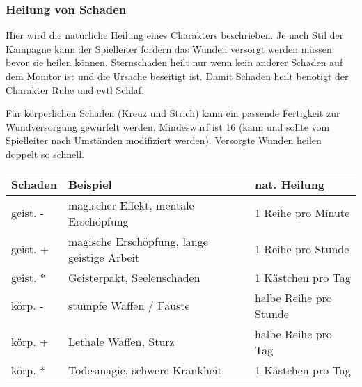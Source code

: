 \documentclass{article}
\begin{document}
\subsubsection{Heilung von Schaden}

Hier wird die natürliche Heilung eines Charakters beschrieben. Je nach Stil der Kampagne kann der Spielleiter
fordern das Wunden versorgt werden müssen bevor sie heilen können. Sternschaden heilt nur wenn kein anderer Schaden
auf dem Monitor ist und die Ursache beseitigt ist. Damit Schaden heilt benötigt der Charakter Ruhe und evtl Schlaf.

Für körperlichen Schaden (Kreuz und Strich) kann ein passende Fertigkeit zur Wundversorgung gewürfelt werden,
Mindeswurf ist 16 (kann und sollte vom Spielleiter nach Umständen modifiziert werden). Versorgte Wunden heilen
doppelt so schnell.


\begin{small}
\begin{tabular}{|m{3cm}|m{5cm}|m{5cm}|}
\hline
\textbf{Schaden}&\textbf{Beispiel}&\textbf{nat. Heilung}\\
\hline
\hline
geist. -&magischer Effekt, mentale Erschöpfung&1 Reihe pro Minute\\
\hline
geist. +&magische Erschöpfung, lange geistige Arbeit&1 Reihe pro Stunde\\
\hline
geist. *&Geisterpakt, Seelenschaden&1 Kästchen pro Tag\\
\hline
körp. -&stumpfe Waffen / Fäuste&halbe Reihe pro Stunde\\
\hline
körp. +&Lethale Waffen, Sturz&halbe Reihe pro Tag\\
\hline
körp. *&Todesmagie, schwere Krankheit&1 Kästchen pro Tag\\
\hline
\end{tabular}
\end{small}
\end{document}
